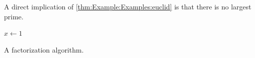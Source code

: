 \begin{corollary}
	A direct implication of \cref{thm:Example:Examples:euclid} is that there is no largest prime.
\end{corollary}

\begin{algorithm}[H]
	\BlankLine
	$x \longleftarrow 1$\;
	\caption{A factorization algorithm.
	\label{alg:Example:Examples:algorithm}}
\end{algorithm}

